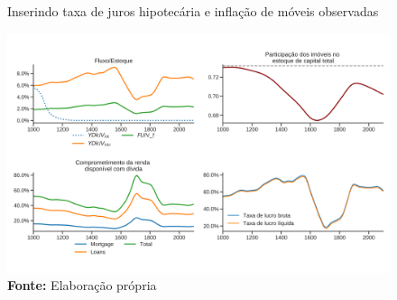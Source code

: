 \begin{figure}[H]
	\centering
	\caption{Inserindo taxa de juros hipotecária e inflação de móveis observadas}
	\label{choque_RealNorms}
	\includegraphics[width=\textwidth]{../../Modelo/Versoes/Shock_RealNorms.png}
	\caption*{\textbf{Fonte:} Elaboração própria}
\end{figure}

